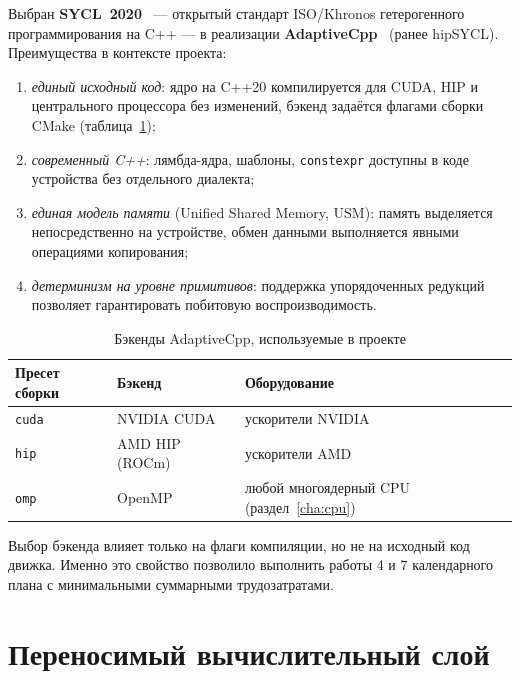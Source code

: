 Выбран \textbf{SYCL~2020}~\cite{sycl2020} --- открытый стандарт ISO/Khronos
гетерогенного программирования на C++ --- в реализации
\textbf{AdaptiveCpp}~\cite{alpay2020adaptivecpp} (ранее hipSYCL). Преимущества
в контексте проекта:
\begin{enumerate}
  \item \emph{единый исходный код}: ядро на C++20 компилируется для CUDA, HIP
        и центрального процессора без изменений, бэкенд задаётся флагами
        сборки CMake (таблица~\ref{tab:backends});
  \item \emph{современный C++}: лямбда-ядра, шаблоны, \texttt{constexpr}
        доступны в коде устройства без отдельного диалекта;
  \item \emph{единая модель памяти} (Unified Shared Memory, USM): память
        выделяется непосредственно на устройстве, обмен данными выполняется
        явными операциями копирования;
  \item \emph{детерминизм на уровне примитивов}: поддержка упорядоченных
        редукций позволяет гарантировать побитовую воспроизводимость.
\end{enumerate}

\begin{table}[ht]
  \centering
  \caption{Бэкенды AdaptiveCpp, используемые в проекте}
  \label{tab:backends}
  \small
  \begin{tabular}{lll}
    \toprule
    Пресет сборки & Бэкенд & Оборудование \\
    \midrule
    \texttt{cuda} & NVIDIA CUDA & ускорители NVIDIA \\
    \texttt{hip}  & AMD HIP (ROCm) & ускорители AMD \\
    \texttt{omp}  & OpenMP & любой многоядерный CPU (раздел~\ref{cha:cpu}) \\
    \bottomrule
  \end{tabular}
\end{table}

Выбор бэкенда влияет только на флаги компиляции, но не на исходный код
движка. Именно это свойство позволило выполнить работы 4 и 7 календарного
плана с минимальными суммарными трудозатратами.

\section{Переносимый вычислительный слой}

